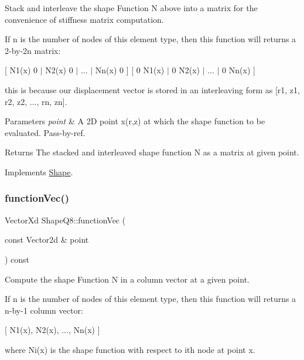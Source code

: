 Stack and interleave the shape Function N above into a matrix for the convenience of stiffness matrix computation. 

If n is the number of nodes of this element type, then this function will returns a 2-\/by-\/2n matrix\+:

\mbox{[} N1(x) 0 $\vert$ N2(x) 0 $\vert$ ... $\vert$ Nn(x) 0 \mbox{]} \mbox{[} 0 N1(x) $\vert$ 0 N2(x) $\vert$ ... $\vert$ 0 Nn(x) \mbox{]}

this is because our displacement vector is stored in an interleaving form as \mbox{[}r1, z1, r2, z2, ..., rn, zn\mbox{]}.


\begin{DoxyParams}{Parameters}
{\em point} & A 2D point x(r,z) at which the shape function to be evaluated. Pass-\/by-\/ref. \\
\hline
\end{DoxyParams}
\begin{DoxyReturn}{Returns}
The stacked and interleaved shape function N as a matrix at given point. 
\end{DoxyReturn}


Implements \mbox{\hyperlink{class_shape_a7a2dc7c642bdea2a1359e3795fd9414d}{Shape}}.

\mbox{\label{class_shape_q8_a7e2de42658deff3c6912cc102b12cc96}} 
\subsubsection{\texorpdfstring{function\+Vec()}{functionVec()}}
{\footnotesize\ttfamily Vector\+Xd Shape\+Q8\+::function\+Vec (\begin{DoxyParamCaption}\item[{const Vector2d \&}]{point }\end{DoxyParamCaption}) const\hspace{0.3cm}{\ttfamily [virtual]}}



Compute the shape Function N in a column vector at a given point. 

If n is the number of nodes of this element type, then this function will returns a n-\/by-\/1 column vector\+:

\mbox{[} N1(x), N2(x), ..., Nn(x) \mbox{]}

where Ni(x) is the shape function with respect to ith node at point x.


